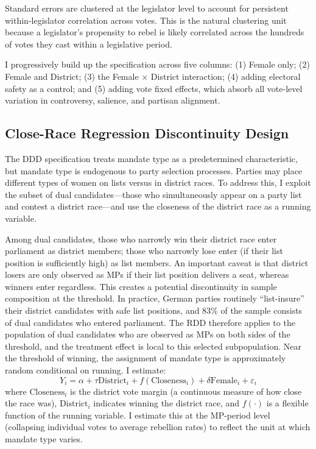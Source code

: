 \documentclass[12pt]{article}
\begin{document}
Standard errors are clustered at the legislator level to account for persistent within-legislator correlation across votes. This is the natural clustering unit because a legislator's propensity to rebel is likely correlated across the hundreds of votes they cast within a legislative period.

I progressively build up the specification across five columns: (1) Female only; (2) Female and District; (3) the Female $\times$ District interaction; (4) adding electoral safety as a control; and (5) adding vote fixed effects, which absorb all vote-level variation in controversy, salience, and partisan alignment.

\subsection{Close-Race Regression Discontinuity Design}

The DDD specification treats mandate type as a predetermined characteristic, but mandate type is endogenous to party selection processes. Parties may place different types of women on lists versus in district races. To address this, I exploit the subset of dual candidates---those who simultaneously appear on a party list and contest a district race---and use the closeness of the district race as a running variable.

Among dual candidates, those who narrowly win their district race enter parliament as district members; those who narrowly lose enter (if their list position is sufficiently high) as list members. An important caveat is that district losers are only observed as MPs if their list position delivers a seat, whereas winners enter regardless. This creates a potential discontinuity in sample composition at the threshold. In practice, German parties routinely ``list-insure'' their district candidates with safe list positions, and 83\% of the sample consists of dual candidates who entered parliament. The RDD therefore applies to the population of dual candidates who are observed as MPs on both sides of the threshold, and the treatment effect is local to this selected subpopulation. Near the threshold of winning, the assignment of mandate type is approximately random conditional on running. I estimate:
\begin{equation}\label{eq:rdd}
Y_i = \alpha + \tau \text{District}_i + f(\text{Closeness}_i) + \delta \text{Female}_i + \varepsilon_i
\end{equation}
where $\text{Closeness}_i$ is the district vote margin (a continuous measure of how close the race was), $\text{District}_i$ indicates winning the district race, and $f(\cdot)$ is a flexible function of the running variable. I estimate this at the MP-period level (collapsing individual votes to average rebellion rates) to reflect the unit at which mandate type varies.
\end{document}
